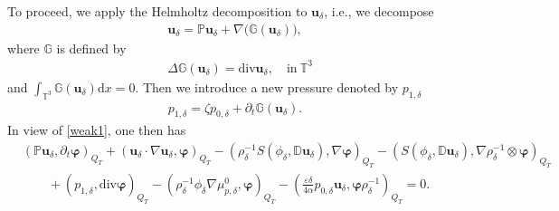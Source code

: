 \documentclass[reqno,a4paper,11pt]{amsart}
\theoremstyle{plain}
\numberwithin{equation}{section}
\renewcommand{\d}{\mathrm{d}}
\begin{document}
To proceed, we apply the Helmholtz decomposition to $\mathbf{u}_{\delta}$, i.e., we decompose
\begin{align}\mathbf{u}_{\delta}=\mathbb{P}\mathbf{u}_{\delta}+\nabla\big( \mathbb{G}(\mathbf{u}_{\delta})\big),\label{Helmholtz decomposition}\end{align}
where $\mathbb{G}$ is defined by
\begin{align*}
	&\Delta \mathbb{G}(\mathbf{u}_{\delta})=\mathrm{div}\mathbf{u}_{\delta},\quad \text{in}\ \mathbb{T}^{3}
\end{align*}
and $\int_{\mathbb{T}^{3}} \mathbb{G}(\mathbf{u}_{\delta})  \d x=0$. Then we introduce a new pressure denoted by $p_{1,\delta}$
\begin{align}
	p_{1,\delta}=\zeta p_{0,\delta}+\partial_{t}\mathbb{G}(\mathbf{u}_{\delta}).\label{new pressure}
\end{align}
In view of \eqref{weak1}, one then has
\begin{align}\label{newweak1}
	&\nonumber(\mathbb{P}\mathbf{u}_{\delta},\partial_{t}\boldsymbol{\varphi})_{Q_{T}}+(\mathbf{u}_{\delta}\cdot\nabla\mathbf{u}_{\delta},\boldsymbol{\varphi})_{Q_{T}}-(\rho_{\delta}^{-1}S(\phi_{\delta},\mathbb{ D}\mathbf{u}_{\delta}),\nabla\boldsymbol{\varphi})_{Q_{T}}-(S(\phi_{\delta},\mathbb{ D}\mathbf{u}_{\delta}),\nabla\rho_{\delta}^{-1}\otimes\boldsymbol{\varphi})_{Q_{T}}
	\\&\qquad
	+(p_{1,\delta},\mathrm{div}\boldsymbol{\varphi})_{Q_{T}}-(\rho_{\delta}^{-1}\phi_{\delta} \nabla \mu_{p,\delta}^{0},\boldsymbol{\varphi})_{Q_{T}}
	-(\frac{\varepsilon\delta}{4\alpha}  p_{0,\delta} \mathbf{u}_{\delta},\boldsymbol{\varphi}\rho_{\delta}^{-1})_{Q_{T}}=0.
\end{align}
\end{document}
